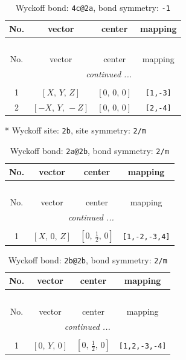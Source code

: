 \documentclass[fleqn,8pt]{jsarticle}
\begin{document}
\renewcommand{\arraystretch}{1.2}
\begin{longtable}{cccc}
\caption{Wyckoff bond: {\tt 4c@2a}, bond symmetry: {\tt -1}}
 \\
 \hline \hline
No. & vector & center & mapping \\ \hline \endfirsthead

\multicolumn{3}{l}{\tablename\ \thetable{}} \\
 \hline \hline
No. & vector & center & mapping \\ \hline \endhead

 \hline \hline
\multicolumn{3}{r}{\footnotesize\it continued ...} \\ \endfoot

 \hline \hline
\multicolumn{3}{r}{} \\ \endlastfoot

1 & $\left[ X,\, Y,\, Z \right]$ & $\left[ 0,\, 0,\, 0 \right]$ & {\tt [1,-3]} \\ \hline
2 & $\left[ - X,\, Y,\, - Z \right]$ & $\left[ 0,\, 0,\, 0 \right]$ & {\tt [2,-4]} \\
\end{longtable}
* Wyckoff site: {\tt 2b}, site symmetry: {\tt 2/m}
\renewcommand{\arraystretch}{1.2}
\begin{longtable}{cccc}
\caption{Wyckoff bond: {\tt 2a@2b}, bond symmetry: {\tt 2/m}}
 \\
 \hline \hline
No. & vector & center & mapping \\ \hline \endfirsthead

\multicolumn{3}{l}{\tablename\ \thetable{}} \\
 \hline \hline
No. & vector & center & mapping \\ \hline \endhead

 \hline \hline
\multicolumn{3}{r}{\footnotesize\it continued ...} \\ \endfoot

 \hline \hline
\multicolumn{3}{r}{} \\ \endlastfoot

1 & $\left[ X,\, 0,\, Z \right]$ & $\left[ 0,\, \frac{1}{2},\, 0 \right]$ & {\tt [1,-2,-3,4]} \\
\end{longtable}
\renewcommand{\arraystretch}{1.2}
\begin{longtable}{cccc}
\caption{Wyckoff bond: {\tt 2b@2b}, bond symmetry: {\tt 2/m}}
 \\
 \hline \hline
No. & vector & center & mapping \\ \hline \endfirsthead

\multicolumn{3}{l}{\tablename\ \thetable{}} \\
 \hline \hline
No. & vector & center & mapping \\ \hline \endhead

 \hline \hline
\multicolumn{3}{r}{\footnotesize\it continued ...} \\ \endfoot

 \hline \hline
\multicolumn{3}{r}{} \\ \endlastfoot

1 & $\left[ 0,\, Y,\, 0 \right]$ & $\left[ 0,\, \frac{1}{2},\, 0 \right]$ & {\tt [1,2,-3,-4]} \\
\end{longtable}
\end{document}
